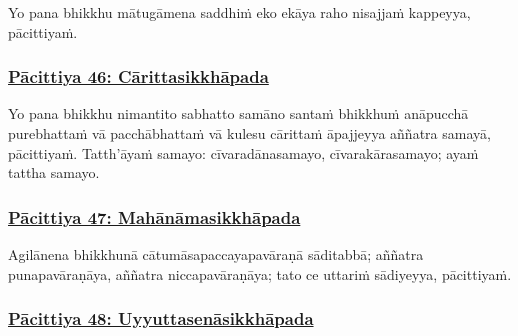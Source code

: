 Yo pana bhikkhu mātugāmena saddhiṁ eko ekāya raho nisajjaṁ kappeyya, pācittiyaṁ.



\subsubsection*{\hyperref[exp46]{Pācittiya 46: Cārittasikkhāpada}}
\label{pac46}

Yo pana bhikkhu nimantito sabhatto samāno santaṁ bhikkhuṁ anāpucchā purebhattaṁ vā pacchābhattaṁ vā kulesu cārittaṁ\makeatletter\hyperlink{endnote315-appendix}\makeatother{} āpajjeyya aññatra samayā, pācittiyaṁ. Tatth'āyaṁ samayo: cīvaradānasamayo, cīvarakārasamayo; ayaṁ tattha samayo.



\subsubsection*{\hyperref[exp47]{Pācittiya 47: Mahānāmasikkhāpada}}
\label{pac47}

Agilānena\makeatletter\hyperlink{endnote316-appendix}\makeatother{} bhikkhunā cātumāsapaccayapavāraṇā\makeatletter\hyperlink{endnote317-appendix}\makeatother{} sāditabbā; aññatra punapavāraṇāya, aññatra niccapavāraṇāya; tato ce uttariṁ\makeatletter\hyperlink{endnote318-appendix}\makeatother{} sādiyeyya, pācittiyaṁ.



\subsubsection*{\hyperref[exp48]{Pācittiya 48: Uyyuttasenāsikkhāpada}}
\label{pac48}

